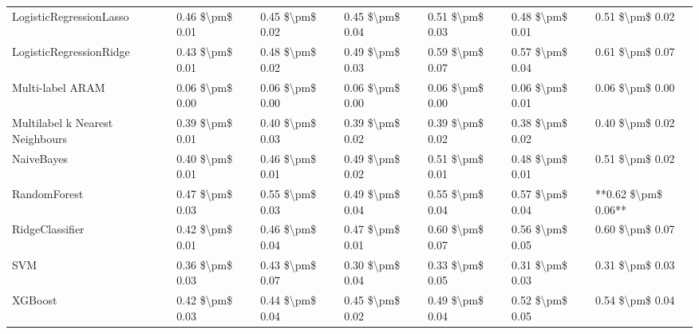 \begin{tabular}{lllllll}
LogisticRegressionLasso         &  0.46 \$\textbackslash pm\$ 0.01 &           0.45 \$\textbackslash pm\$ 0.02 &       0.45 \$\textbackslash pm\$ 0.04 &        0.51 \$\textbackslash pm\$ 0.03 &                         0.48 \$\textbackslash pm\$ 0.01 &      0.51 \$\textbackslash pm\$ 0.02 \\
LogisticRegressionRidge         &  0.43 \$\textbackslash pm\$ 0.01 &           0.48 \$\textbackslash pm\$ 0.02 &       0.49 \$\textbackslash pm\$ 0.03 &        0.59 \$\textbackslash pm\$ 0.07 &                         0.57 \$\textbackslash pm\$ 0.04 &      0.61 \$\textbackslash pm\$ 0.07 \\
Multi-label ARAM                &  0.06 \$\textbackslash pm\$ 0.00 &           0.06 \$\textbackslash pm\$ 0.00 &       0.06 \$\textbackslash pm\$ 0.00 &        0.06 \$\textbackslash pm\$ 0.00 &                         0.06 \$\textbackslash pm\$ 0.01 &      0.06 \$\textbackslash pm\$ 0.00 \\
Multilabel k Nearest Neighbours &  0.39 \$\textbackslash pm\$ 0.01 &           0.40 \$\textbackslash pm\$ 0.03 &       0.39 \$\textbackslash pm\$ 0.02 &        0.39 \$\textbackslash pm\$ 0.02 &                         0.38 \$\textbackslash pm\$ 0.02 &      0.40 \$\textbackslash pm\$ 0.02 \\
NaiveBayes                      &  0.40 \$\textbackslash pm\$ 0.01 &           0.46 \$\textbackslash pm\$ 0.01 &       0.49 \$\textbackslash pm\$ 0.02 &        0.51 \$\textbackslash pm\$ 0.01 &                         0.48 \$\textbackslash pm\$ 0.01 &      0.51 \$\textbackslash pm\$ 0.02 \\
RandomForest                    &  0.47 \$\textbackslash pm\$ 0.03 &           0.55 \$\textbackslash pm\$ 0.03 &       0.49 \$\textbackslash pm\$ 0.04 &        0.55 \$\textbackslash pm\$ 0.04 &                         0.57 \$\textbackslash pm\$ 0.04 &  **0.62 \$\textbackslash pm\$ 0.06** \\
RidgeClassifier                 &  0.42 \$\textbackslash pm\$ 0.01 &           0.46 \$\textbackslash pm\$ 0.04 &       0.47 \$\textbackslash pm\$ 0.01 &        0.60 \$\textbackslash pm\$ 0.07 &                         0.56 \$\textbackslash pm\$ 0.05 &      0.60 \$\textbackslash pm\$ 0.07 \\
SVM                             &  0.36 \$\textbackslash pm\$ 0.03 &           0.43 \$\textbackslash pm\$ 0.07 &       0.30 \$\textbackslash pm\$ 0.04 &        0.33 \$\textbackslash pm\$ 0.05 &                         0.31 \$\textbackslash pm\$ 0.03 &      0.31 \$\textbackslash pm\$ 0.03 \\
XGBoost                         &  0.42 \$\textbackslash pm\$ 0.03 &           0.44 \$\textbackslash pm\$ 0.04 &       0.45 \$\textbackslash pm\$ 0.02 &        0.49 \$\textbackslash pm\$ 0.04 &                         0.52 \$\textbackslash pm\$ 0.05 &      0.54 \$\textbackslash pm\$ 0.04 \\
\bottomrule
\end{tabular}
